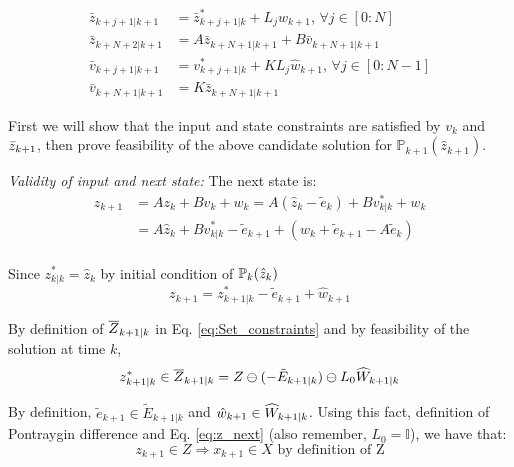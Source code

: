 \begin{subequations}
\begin{align}
\label{eq:candidate}
\bar{z}_{k+j+1|k+1} &= \bar{z}^{*}_{k+j+1|k} + L_j\hat{w}_{k+1}, \, \forall j \in [0:N]\\
\bar{z}_{k+N+2|k+1}&= A\bar{z}_{k+N+1|k+1} + B\bar{v}_{k+N+1|k+1} \\
\bar{v}_{k+j+1|k+1}&=v^{*}_{k+j+1|k} + KL_j\hat{w}_{k+1}, \, \forall j \in [0:N-1]\\
\bar{v}_{k+N+1|k+1}&=K\bar{z}_{k+N+1|k+1} 
\end{align}
\end{subequations}

First we will show that the input and state constraints are satisfied by $v_k$ and $\bar{z}_{k+1}$, then prove feasibility of the above candidate solution for $\mathbb{P}_{k+1}(\hat{z}_{k+1})$.

\textit{Validity of input and next state:}
The next state is:
\begin{subequations}
\begin{align}
\label{eq:z_next}
z_{k+1} &= Az_k + Bv_k + w_k = A(\hat{z}_k-\tilde{e}_k)+Bv^{*}_{k|k}+w_k \nonumber \\
 &= A\hat{z}_k+Bv^{*}_{k|k}-\tilde{e}_{k+1}+(w_k+\tilde{e}_{k+1}-A\tilde{e}_k) \\
\end{align}
\end{subequations}

Since $z^{*}_{k|k} = \hat{z}_k$ by initial condition of $\mathbb{P}_{k}(\hat{z}_{k})$
\begin{equation*}
z_{k+1} = z^{*}_{k+1|k} - \tilde{e}_{k+1} + \hat{w}_{k+1}
\end{equation*}

By definition of $\overline{Z}_{k+1|k}$ in Eq. \ref{eq:Set_constraints} and by feasibility of the solution at time $k$,
\begin{equation}
z^{*}_{k+1|k} \in\overline{Z}_{k+1|k} = Z \ominus (-\tilde{E}_{k+1|k}) \ominus L_0\widehat{W}_{k+1|k}
\end{equation}

By definition, $\tilde{e}_{k+1} \in \tilde{E}_{k+1|k}$ and $\hat{w}_{k+1} \in  \widehat{W}_{k+1|k}$. Using this fact, definition of Pontraygin difference and Eq. \ref{eq:z_next} (also remember, $L_0 = \mathbb{I}$), we have that:
\begin{equation}
z_{k+1}\in Z \Rightarrow x_{k+1} \in X \text{ by definition of Z}
\end{equation}


